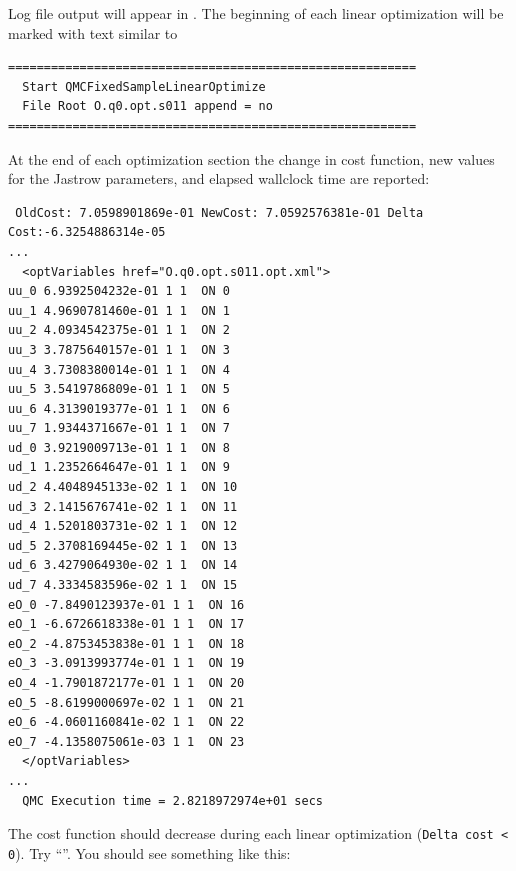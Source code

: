 Log file output will appear in .  The beginning of each linear optimization will be marked with text similar to
\begin{shaded}
\begin{verbatim}
=========================================================
  Start QMCFixedSampleLinearOptimize
  File Root O.q0.opt.s011 append = no 
=========================================================
\end{verbatim}
\end{shaded}
\noindent
At the end of each optimization section the change in cost function, new values for the Jastrow parameters, and elapsed wallclock time are reported:
\begin{shaded}
\begin{verbatim}
 OldCost: 7.0598901869e-01 NewCost: 7.0592576381e-01 Delta Cost:-6.3254886314e-05
...
  <optVariables href="O.q0.opt.s011.opt.xml">
uu_0 6.9392504232e-01 1 1  ON 0
uu_1 4.9690781460e-01 1 1  ON 1
uu_2 4.0934542375e-01 1 1  ON 2
uu_3 3.7875640157e-01 1 1  ON 3
uu_4 3.7308380014e-01 1 1  ON 4
uu_5 3.5419786809e-01 1 1  ON 5
uu_6 4.3139019377e-01 1 1  ON 6
uu_7 1.9344371667e-01 1 1  ON 7
ud_0 3.9219009713e-01 1 1  ON 8
ud_1 1.2352664647e-01 1 1  ON 9
ud_2 4.4048945133e-02 1 1  ON 10
ud_3 2.1415676741e-02 1 1  ON 11
ud_4 1.5201803731e-02 1 1  ON 12
ud_5 2.3708169445e-02 1 1  ON 13
ud_6 3.4279064930e-02 1 1  ON 14
ud_7 4.3334583596e-02 1 1  ON 15
eO_0 -7.8490123937e-01 1 1  ON 16
eO_1 -6.6726618338e-01 1 1  ON 17
eO_2 -4.8753453838e-01 1 1  ON 18
eO_3 -3.0913993774e-01 1 1  ON 19
eO_4 -1.7901872177e-01 1 1  ON 20
eO_5 -8.6199000697e-02 1 1  ON 21
eO_6 -4.0601160841e-02 1 1  ON 22
eO_7 -4.1358075061e-03 1 1  ON 23
  </optVariables>
...
  QMC Execution time = 2.8218972974e+01 secs
\end{verbatim}
\end{shaded}
\noindent
The cost function should decrease during each linear optimization (\texttt{Delta cost < 0}).  Try ``''.  You should see something like this:
